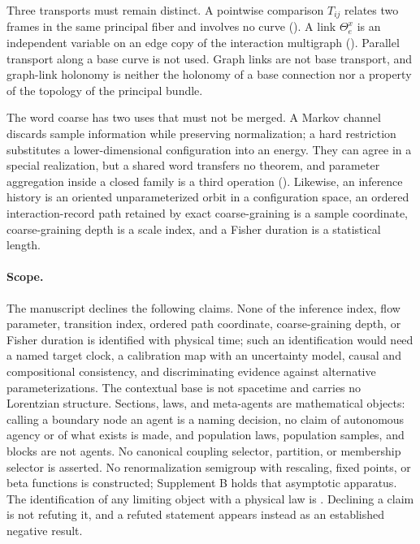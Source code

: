 Three transports must remain distinct. A pointwise comparison $T_{ij}$ relates two frames in the same
principal fiber and involves no curve (). A link $\Theta_e^x$ is an
independent variable on an edge copy of the interaction multigraph (). Parallel
transport along a base curve is not used. Graph links are not base transport, and graph-link holonomy is
neither the holonomy of a base connection nor a property of the topology of the principal bundle.

The word coarse has two uses that must not be merged. A Markov channel discards sample information while
preserving normalization; a hard restriction substitutes a lower-dimensional configuration into an energy.
They can agree in a special realization, but a shared word transfers no theorem, and parameter aggregation
inside a closed family is a third operation (). Likewise, an inference history
is an oriented unparameterized orbit in a configuration space, an ordered interaction-record path retained by
exact coarse-graining is a sample coordinate, coarse-graining depth is a scale index, and a Fisher duration is
a statistical length.

\paragraph{Scope.}
The manuscript declines the following claims. None of the inference index, flow parameter, transition index,
ordered path coordinate, coarse-graining depth, or Fisher duration is identified with physical time; such an
identification would need a named target clock, a calibration map with an uncertainty model, causal and
compositional consistency, and discriminating evidence against alternative parameterizations. The contextual
base is not spacetime and carries no Lorentzian structure. Sections, laws, and meta-agents are mathematical
objects: calling a boundary node an agent is a naming decision, no claim of autonomous agency or of what
exists is made, and population laws, population samples, and blocks are not agents. No canonical coupling
selector, partition, or membership selector is asserted. No renormalization semigroup with rescaling, fixed
points, or beta functions is constructed; Supplement B holds that asymptotic apparatus. The identification of
any limiting object with a physical law is . Declining a claim is not
refuting it, and a refuted statement appears instead as an established negative result. 

